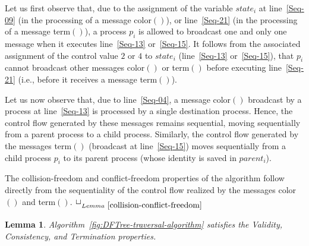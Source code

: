 \documentclass[11pt,english]{article}
\newtheorem{lemma}{Lemma}
\newcommand{\toto}{xxx}
\newenvironment{proofL}{\noindent{\bf
Proof }} {\hspace*{\fill}$\Box_{Lemma~\ref{\toto}}$\par\vspace{3mm}}
\begin{document}
\begin{proofL}
Let us first observe that, due to the assignment of the variable 
$state_i$ at line~\ref{Seq-09} (in the processing of a message 
{\sc color}$()$),  or line~\ref{Seq-21}  (in the processing of a message 
{\sc term}$()$), a process $p_i$ is allowed to  broadcast one and only 
one message  when it executes line~\ref{Seq-13} or~\ref{Seq-15}.
It follows from the associated assignment of the control value $2$ or $4$ to 
$state_i$ (line~\ref{Seq-13} or~\ref{Seq-15}), that $p_i$  cannot broadcast 
other messages {\sc color}$()$ or {\sc term}$()$  before executing
line~\ref{Seq-21} (i.e., before it receives a message {\sc term}$()$).

Let us now observe that, due to line~\ref{Seq-04}, a message 
{\sc color}$()$ broadcast by a process at line~\ref{Seq-13}
is processed by a single destination  process. 
Hence, the control flow generated by these messages remains sequential, moving 
sequentially from a parent process to a child process. 
Similarly, the  control flow generated by the messages {\sc term}$()$ 
(broadcast at line~\ref{Seq-15}) moves sequentially from a child  process $p_i$
to its  parent process (whose identity is saved in $parent_i$). 


The collision-freedom and conflict-freedom properties of the algorithm follow
directly from the sequentiality of the control flow realized by the messages
{\sc color}$()$ and {\sc term}$()$.
\renewcommand{\toto}{collision-conflict-freedom}
\end{proofL}

\begin{lemma}
\label{lemma-three-properties}
Algorithm~{\em\ref{fig:DFTree-traversal-algorithm}} satisfies the 
Validity, Consistency, and Termination properties. 
\end{lemma}
\end{document}
